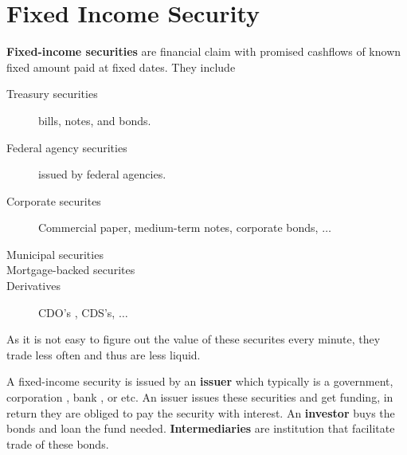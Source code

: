 \chapter{Fixed Income Security}
\textbf{Fixed-income securities} are financial claim with promised cashflows of known fixed amount paid at fixed dates. They include
\begin{description}
    \item[Treasury securities] bills, notes, and bonds.
    \item[Federal agency securities] issued by federal agencies. 
    \item[Corporate securites] Commercial paper, medium-term notes, corporate bonds, \(\dots\) 
    \item[Municipal securities]
    \item[Mortgage-backed securites]
    \item[Derivatives] CDO's , CDS's, \(\dots\)   
\end{description}

As it is not easy to figure out the value of these securites every minute, they trade less often and thus are less liquid.

A fixed-income security is issued by an \textbf{issuer} which typically is a government, corporation , bank , or etc. An issuer issues these securities and get funding, in return they are obliged to pay the security with interest. An \textbf{investor} buys the bonds and loan the fund needed. \textbf{Intermediaries} are institution that facilitate trade of these bonds.